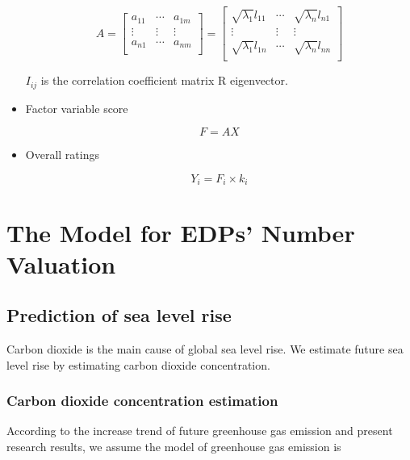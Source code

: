 \documentclass[12pt]{article}  %
\begin{document}
\begin{itemize}
\begin{equation}
    A=\left[ \begin{matrix}
	a_{11}&		\cdots&		a_{1m}\\
	\vdots&		\vdots&		\vdots\\
	a_{n1}&		\cdots&		a_{nm}\\
\end{matrix} \right] =\left[ \begin{matrix}
	\sqrt{\lambda _1}l_{11}&		\cdots&		\sqrt{\lambda _n}l_{n1}\\
	\vdots&		\vdots&		\vdots\\
	\sqrt{\lambda _1}l_{1n}&		\cdots&		\sqrt{\lambda _n}l_{nn}\\
\end{matrix} \right] 
\end{equation}

$I_{ij}$ is the correlation coefficient matrix R eigenvector.
    
    \item Factor variable score
    
    \begin{equation}
        F=AX
    \end{equation}

    \item Overall ratings
    
\begin{equation}
    Y_i=F_i\times k_i
\end{equation}

    
\end{itemize}











\section{The Model for EDPs’ Number Valuation}

\subsection{Prediction of sea level rise}

Carbon dioxide is the main cause of global sea level rise. We estimate future sea level rise by estimating carbon dioxide concentration.

\subsubsection{Carbon dioxide concentration estimation}
According to the increase trend of future greenhouse gas emission and present research results, we assume the model of greenhouse gas emission is
\end{document}
